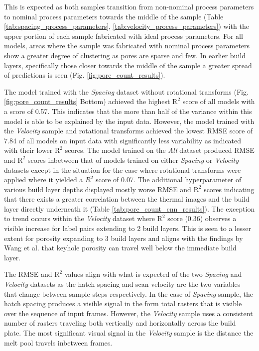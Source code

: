 This is expected as both samples transition from non-nominal process parameters
to nominal process parameters towards the middle of the sample (Table
\ref{tab:spacing_process_parameters}, \ref{tab:velocity_process_parameters})
with the upper portion of each sample fabricated with ideal process parameters.
For all models, areas where the sample was fabricated with nominal process
parameters show a greater degree of clustering as pores are sparse and few. In
earlier build layers, specifically those closer towards the middle of the sample
a greater spread of predictions is seen (Fig. \ref{fig:pore_count_results}).

The model trained with the \textit{Spacing} dataset without rotational
transforms (Fig. \ref{fig:pore_count_results} Bottom) achieved the highest
$\text{R}^2$ score of all models with a score of 0.57. This indicates that the
more than half of the variance within this model is able to be explained by the
input data. However, the model trained with the \textit{Velocity} sample and
rotational transforms achieved the lowest RMSE score of 7.84 of all models on
input data with significantly less variability as indicated with their lower
$\text{R}^2$ scores. The model trained on the \textit{All} dataset produced RMSE
and $\text{R}^2$ scores inbetween that of models trained on either
\textit{Spacing} or \textit{Velocity} datasets except in the situation for the
case where rotational transforms were applied where it yielded a $R^2$ score of
0.07. The additional hyperparameter of various build layer depths displayed
mostly worse RMSE and $\text{R}^2$ scores indicating that there exists a greater
correlation between the thermal images and the build layer directly underneath
it (Table \ref{tab:pore_count_cnn_results}). The exception to trend occurs
within the \textit{Velocity} dataset where $\text{R}^2$ score (0.36) observes a
visible increase for label pairs extending to 2 build layers. This is seen to a
lesser extent for porosity expanding to 3 build layers and aligns with the
findings by Wang et al. \cite{wang_mechanism_2022} that keyhole porosity can
travel well below the immediate build layer.

The RMSE and $\text{R}^2$ values align with what is expected of the two
\textit{Spacing} and \textit{Velocity} datasets as the hatch spacing and scan
velocity are the two variables that change between sample steps respectively. In
the case of \textit{Spacing} sample, the hatch spacing produces a visible signal
in the form total rasters that is visible over the sequence of input frames.
However, the \textit{Velocity} sample uses a consistent number of rasters
traveling both vertically and horizontally across the build plate. The most
significant visual signal in the \textit{Velocity} sample is the distance the
melt pool travels inbetween frames.

